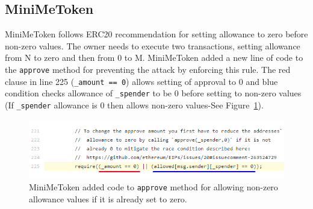 \subsection{MiniMeToken}\label{sec:MiniMeToken}
MiniMeToken\cite{Ref15} follows ERC20 recommendation for setting allowance to zero before non-zero values. The owner needs to execute two transactions, setting allowance from N to zero and then from 0 to M. MiniMeToken added a new line of code to the \texttt{approve} method for preventing the attack by enforcing this rule. The red clause in line 225 (\texttt{\_amount == 0}) allows setting of approval to 0 and blue condition checks allowance of \texttt{\_spender} to be 0 before setting to non-zero values (\ie If \texttt{\_spender} allowance is 0 then allows non-zero values-See Figure~\ref{fig:mini}).
\begin{figure}[t]
	\centering
	\includegraphics[width=1.0\linewidth]{figures/multiple_withdrawal_06.png}
	\caption{MiniMeToken added code to \texttt{approve} method for allowing non-zero allowance values if it is already set to zero.\label{fig:mini}}
\end{figure}

